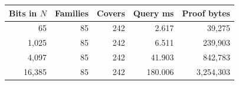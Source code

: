 \begin{tabular}{rrrrr}
\toprule
Bits in $N$ & Families & Covers & Query ms & Proof bytes\\
\midrule
65 & 85 & 242 & 2.617 & 39,275 \\
1,025 & 85 & 242 & 6.511 & 239,903 \\
4,097 & 85 & 242 & 41.903 & 842,783 \\
16,385 & 85 & 242 & 180.006 & 3,254,303 \\
\bottomrule
\end{tabular}
